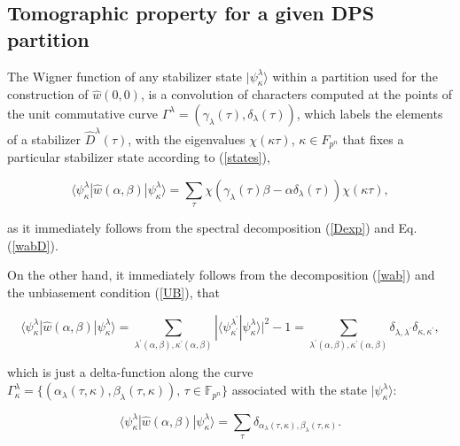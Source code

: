 \documentclass[quantumrep,article,submit,pdftex,moreauthors]{Definitions/mdpi}
\begin{document}
\subsection{Tomographic property for a given DPS partition}

The Wigner function of any stabilizer state $|\psi_{\kappa}^{\lambda}\rangle$
within a partition used for the construction of $\hat{w}\left(0,0\right)$, is a
convolution of characters computed at the points of the unit commutative curve
$\Gamma^{\lambda}=\left(\gamma_{\lambda}\left(\tau\right),\delta_{\lambda}(\tau)\right)
$, which labels the elements of a stabilizer $\hat{D}^{\lambda}(\tau)$, with the
eigenvalues $\chi(\kappa\tau)$, $\kappa \in F_{p^{n}}$ that fixes a particular
stabilizer state according to (\ref{states}),

\begin{equation}
  \langle \psi_{\kappa}^{\lambda}|\hat{w}\left( \alpha,\beta \right)
  |\psi_{\kappa}^{\lambda}\rangle
  = \sum_{\tau }\chi \left(
    \gamma_{\lambda}(\tau)\beta-\alpha \delta_{\lambda}(\tau)
  \right) \chi(\kappa\tau),
  \label{T1}
\end{equation}

as it immediately follows from the spectral decomposition (\ref{Dexp}) and Eq.
(\ref{wabD}).

On the other hand, it immediately follows from the decomposition (\ref{wab}) and
the unbiasement condition (\ref{UB}), that

\begin{equation}
  \langle \psi_{\kappa }^{\lambda}|\hat{w}\left( \alpha,\beta \right)
  |\psi_{\kappa}^{\lambda}\rangle
  = \sum_{\lambda^{\prime}(\alpha,\beta),\kappa^{\prime }(\alpha,\beta)}
  |\langle
    \psi_{\kappa^{\prime}}^{\lambda^{\prime }}|\psi_{\kappa}^{\lambda}
  \rangle|^{2}-1
  = \sum_{\lambda^{\prime}(\alpha,\beta),\kappa^{\prime}(\alpha,\beta)}
  \delta_{\lambda,\lambda^{\prime}}\delta_{\kappa,\kappa^{\prime}},
\end{equation}

which is just a delta-function along the curve $\Gamma_{\kappa}^{\lambda} =
\{(\alpha_{\lambda}(\tau,\kappa),\beta_{\lambda}(\tau,\kappa)),\,\tau \in
\mathbb F_{p^{n}}\}$ associated with the state $|\psi_{\kappa
}^{\lambda}\rangle$:

\begin{equation}
  \langle \psi_{\kappa}^{\lambda}
  |\hat{w}\left( \alpha,\beta \right)
  |\psi_{\kappa }^{\lambda}
  \rangle = \sum_{\tau} \delta_{\alpha_{\lambda}(\tau,\kappa),
  \beta_{\lambda}(\tau ,\kappa )}.
  \label{T2}
\end{equation}
\end{document}
